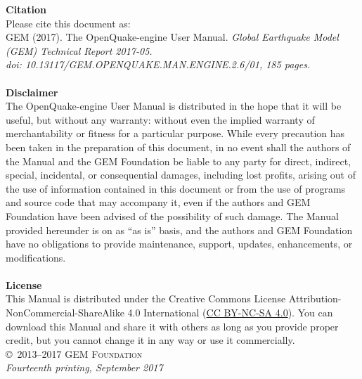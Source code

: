 \documentclass[11pt,fleqn]{book} %
\begin{document}
\noindent
   {\textbf{Citation}} \hfill \\
   Please cite this document as: \hfill \\
   GEM (2017). The OpenQuake-engine User Manual.
   \textit{Global Earthquake Model (GEM) Technical Report 2017-05.\\
   doi: 10.13117/GEM.OPENQUAKE.MAN.ENGINE.2.6/01, 185 pages.} \hfill \\
\noindent \hfill\\
\noindent
   {\bf{Disclaimer}} \hfill \\
   The OpenQuake-engine User Manual is distributed in the hope that it will be
   useful, but without any warranty: without even the implied warranty of
   merchantability or fitness for a particular purpose. While every precaution
   has been taken in the preparation of this document, in no event shall the
   authors of the Manual and the GEM Foundation be liable to any party for
   direct, indirect, special, incidental, or consequential damages, including
   lost profits, arising out of the use of information contained in this
   document or from the use of programs and source code that may accompany it,
   even if the authors and GEM Foundation have been advised of the possibility
   of such damage. The Manual provided hereunder is on as ``as is'' basis, and
   the  authors and GEM Foundation have no obligations to provide maintenance,
   support, updates, enhancements, or modifications. \hfill \\
\noindent \hfill\\
\noindent
   {\bf{License}} \hfill \\
   This Manual is distributed under the Creative Commons License  Attribution-
   NonCommercial-ShareAlike 4.0 International
   (\href{http://creativecommons.org/licenses/by-nc-sa/4.0/} {CC BY-NC-SA
   4.0}). You can download this Manual and share it with others as long as you
   provide proper credit, but you cannot change it in any way or use it
   commercially.\hfill \\

\noindent \copyright\ \textsc{2013--2017 GEM Foundation}\\
\noindent \textit{Fourteenth printing, September 2017} %


\pagestyle{empty} %
\tableofcontents %
\cleardoublepage %
\pagestyle{fancy} %
\end{document}
